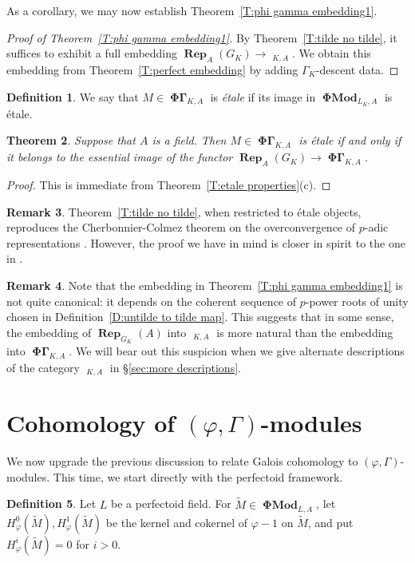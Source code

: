 \documentclass[12pt]{amsart}
\newtheorem{theorem}{Theorem}[section]
\theoremstyle{definition}
\newtheorem{defn}[theorem]{Definition}
\newtheorem{remark}[theorem]{Remark}
\numberwithin{equation}{theorem}
\DeclareMathOperator{\PhiGamma}{\mathbf{\Phi \Gamma}}
\DeclareMathOperator{\PhiGammatilde}{\widetilde{\mathbf{\Phi \Gamma}}}
\DeclareMathOperator{\PhiMod}{\mathbf{\Phi Mod}}
\DeclareMathOperator{\Rep}{\mathbf{Rep}}
\begin{document}
As a corollary, we may now establish Theorem~\ref{T:phi gamma embedding1}.
\begin{proof}[Proof of Theorem~\ref{T:phi gamma embedding1}]
By Theorem~\ref{T:tilde no tilde}, it suffices to exhibit a full embedding
$\Rep_A(G_K) \to \PhiGammatilde_{K,A}$. We obtain this embedding from
Theorem~\ref{T:perfect embedding} by adding $\Gamma_K$-descent data.
\end{proof}

\begin{defn}
We say that $M \in \PhiGamma_{K,A}$ is \emph{\'etale} if its image in $\PhiMod_{L_K,A}$ is \'etale. 
\end{defn}

\begin{theorem}
Suppose that $A$ is a field. Then $M \in \PhiGamma_{K,A}$ is \'etale if and only if it belongs
to the essential image of the functor $\Rep_A(G_K)\to \PhiGamma_{K,A}$.
\end{theorem}
\begin{proof}
This is immediate from Theorem~\ref{T:etale properties}(c).
\end{proof}

\begin{remark}
Theorem~\ref{T:tilde no tilde}, when restricted to \'etale objects, reproduces the Cherbonnier-Colmez theorem on the overconvergence of $p$-adic representations \cite{cherbonnier-colmez}. However, the proof we have in mind is closer in spirit to the one in \cite[\S 2]{kedlaya-new-phigamma}.
\end{remark}

\begin{remark}
Note that the embedding in Theorem~\ref{T:phi gamma embedding1} is not quite canonical: it depends on the coherent sequence of $p$-power roots of unity chosen in Definition~\ref{D:untilde to tilde map}. This suggests that in some sense, the embedding of $\Rep_{G_K}(A)$ into $\PhiGammatilde_{K,A}$  is more natural than the embedding into $\PhiGamma_{K,A}$. We will bear out this suspicion when we give alternate descriptions of the category $\PhiGammatilde_{K,A}$ in \S\ref{sec:more descriptions}.
\end{remark}

\section{Cohomology of $(\varphi, \Gamma)$-modules}

We now upgrade the previous discussion to relate Galois cohomology to $(\varphi, \Gamma)$-modules. This time, we start directly with the perfectoid framework.
\begin{defn}
Let $L$ be a perfectoid field.
For $\tilde{M} \in \PhiMod_{L,A}$, let $H^0_{\varphi}(\tilde{M}), H^1_{\varphi}(\tilde{M})$ be the kernel and cokernel of $\varphi-1$ on $\tilde{M}$, and put $H^i_{\varphi}(\tilde{M}) = 0$ for $i>0$.
\end{defn}
\end{document}
